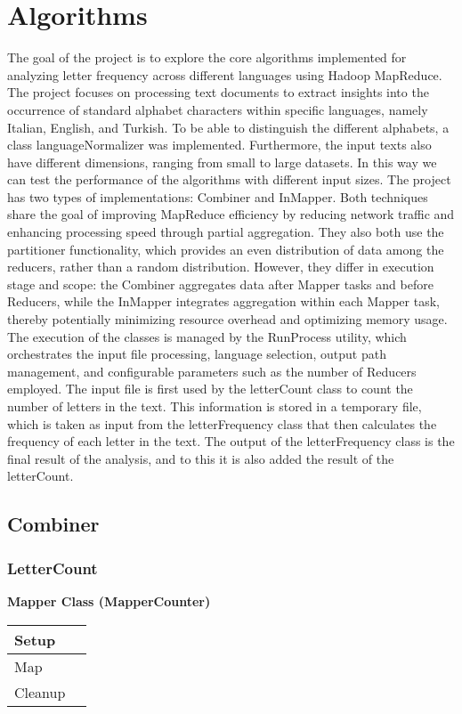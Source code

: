 \chapter{Algorithms}


The goal of the project is to explore the core algorithms implemented for analyzing letter frequency across different languages using Hadoop MapReduce. 
The project focuses on processing text documents to extract insights into the occurrence of standard alphabet characters within specific languages, namely Italian, English, and Turkish. 
To be able to distinguish the different alphabets, a class languageNormalizer was implemented. 
Furthermore, the input texts also have different dimensions, ranging from small to large datasets.
In this way we can test the performance of the algorithms with different input sizes.
The project has two types of implementations: Combiner and InMapper. Both techniques share the goal of improving MapReduce efficiency by reducing network traffic and enhancing processing speed through partial aggregation. They also both use the partitioner functionality, which provides an even distribution of data among the reducers, rather than a random distribution. However, they differ in execution stage and scope: the Combiner aggregates data after Mapper tasks and before Reducers, while the InMapper integrates aggregation within each Mapper task, thereby potentially minimizing resource overhead and optimizing memory usage. 
The execution of the classes is managed by the RunProcess utility, which orchestrates the input file processing, language selection, output path management, and configurable parameters such as the number of Reducers employed. The input file is first used by the letterCount class to count the number of letters in the text. This information is stored in a temporary file, which is taken as input from the letterFrequency class that then calculates the frequency of each letter in the text. The output of the letterFrequency class is the final result of the analysis, and to this it is also added the result of the letterCount.

\section{Combiner}

\subsection{LetterCount}
\textbf{Mapper Class (MapperCounter)}
\begin{longtable}{|>{\raggedright\arraybackslash}p{}|>{\raggedright\arraybackslash}p{}|}
    \hline
    Setup &  \\
    \hline
    Map &  \\
    \hline
    Cleanup & \\
    \hline
\end{longtable}

